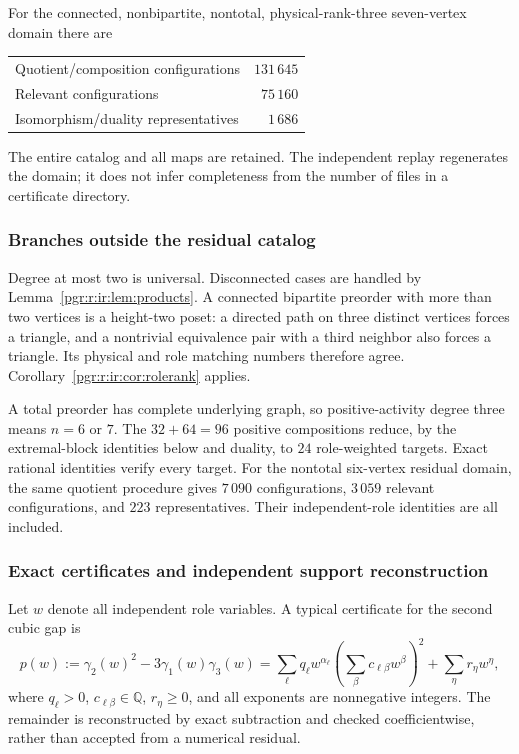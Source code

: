 \documentclass[11pt]{article}
\numberwithin{equation}{section}
\theoremstyle{definition}\newtheorem{definition}[theorem]{Definition}\newtheorem{remark}[theorem]{Remark}
\begin{document}
For the connected, nonbipartite, nontotal, physical-rank-three seven-vertex domain there are
\begin{center}
\begin{tabular}{lr}
Quotient/composition configurations&$131\,645$\\
Relevant configurations&$75\,160$\\
Isomorphism/duality representatives&$1\,686$
\end{tabular}
\end{center}
The entire catalog and all maps are retained. The independent replay regenerates the domain; it does not infer completeness from the number of files in a certificate directory.

\subsubsection{Branches outside the residual catalog}
Degree at most two is universal. Disconnected cases are handled by Lemma~\ref{pgr:r:ir:lem:products}. A connected bipartite preorder with more than two vertices is a height-two poset: a directed path on three distinct vertices forces a triangle, and a nontrivial equivalence pair with a third neighbor also forces a triangle. Its physical and role matching numbers therefore agree. Corollary~\ref{pgr:r:ir:cor:rolerank} applies.

A total preorder has complete underlying graph, so positive-activity degree three means $n=6$ or $7$. The $32+64=96$ positive compositions reduce, by the extremal-block identities below and duality, to $24$ role-weighted targets. Exact rational identities verify every target. For the nontotal six-vertex residual domain, the same quotient procedure gives $7\,090$ configurations, $3\,059$ relevant configurations, and $223$ representatives. Their independent-role identities are all included.

\subsubsection{Exact certificates and independent support reconstruction}\label{pgr:r:ir:sec:certificates}
Let $w$ denote all independent role variables. A typical certificate for the second cubic gap is
\begin{equation}\label{pgr:r:ir:eq:sos}
 p(w):=\gamma_2(w)^2-3\gamma_1(w)\gamma_3(w)
 =\sum_\ell q_\ell w^{\alpha_\ell}
       \left(\sum_\beta c_{\ell\beta}w^\beta\right)^2
  +\sum_\eta r_\eta w^\eta,
\end{equation}
where $q_\ell>0$, $c_{\ell\beta}\in\mathbb Q$, $r_\eta\ge0$, and all exponents are nonnegative integers. The remainder is reconstructed by exact subtraction and checked coefficientwise, rather than accepted from a numerical residual.
\end{document}
